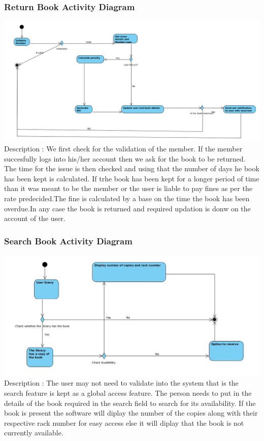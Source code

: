 \documentclass[a4paper]{article}
\begin{document}
\subsubsection*{Return Book Activity Diagram}
\includegraphics[scale=0.40]{images/activityDiagReturn.png}
\\
Description : We first check for the validation of the member. If the member succesfully logs into his/her account then we ask for the book to be returned. The time for the issue is then checked and using that the number of days he book has been kept is calculated. If trhe book has been kept for a longer period of time than it was meant to be the member or the user is liable to pay fines as per the rate predecided.The fine is calculated by a base on the time the book has been overdue.In any case the book is returned and required updation is donw on the account of the user.
\subsubsection*{Search Book Activity Diagram}
\includegraphics[scale=0.50]{images/activityDiagSearch.jpg}
\\
Description : The user may not need to validate into the system that is the search feature is kept as a global access feature. The person needs to put in the details of the book required in the search field to search for its availability. If the book is present the software will diplay the number of the copies along with their respective rack number for easy access else it will diplay that the book is not currently available.
\end{document}
